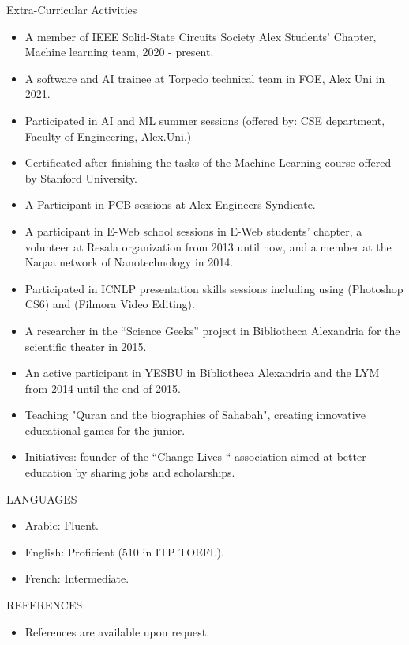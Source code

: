 \documentclass{resume} %
\begin{document}
\begin{rSection}{Extra-Curricular Activities} 
\begin{itemize}
    
    \item A member of IEEE Solid-State Circuits Society Alex Students' Chapter, Machine learning team, 2020 - present.
     \item A software and AI trainee at Torpedo technical team in FOE, Alex Uni in 2021.
    \item 	Participated in AI and ML summer sessions (offered by: CSE department, Faculty of Engineering, Alex.Uni.)
    \item   Certificated after finishing the tasks of the Machine Learning course offered by Stanford University.
    \item A Participant in PCB sessions at Alex Engineers Syndicate.
    \item A participant in E-Web school sessions in E-Web students' chapter, a volunteer at Resala organization from 2013 until now, and a member at the Naqaa network of Nanotechnology in 2014.
    \item Participated in ICNLP presentation skills sessions including using (Photoshop CS6) and (Filmora Video Editing).

    \item A researcher in the “Science Geeks” project in Bibliotheca Alexandria for the scientific theater in 2015.
    \item An active participant in YESBU in Bibliotheca Alexandria and the LYM from 2014 until the end of 2015.
    \item Teaching "Quran and the biographies of Sahabah", creating innovative educational games for the junior.
    \item Initiatives: founder of the “Change Lives “ association aimed at better education by sharing jobs and scholarships.
\end{itemize}


\end{rSection}

\begin{rSection}{LANGUAGES} 
\begin{itemize}
    \item 	Arabic: Fluent.
    \item   English: Proficient (510 in ITP TOEFL).
    \item   French: Intermediate.
\end{itemize}
\end{rSection}




\begin{rSection}{REFERENCES} 
\begin{itemize}
    \item 	References are available upon request.
\end{itemize}


\end{rSection}
\end{document}
